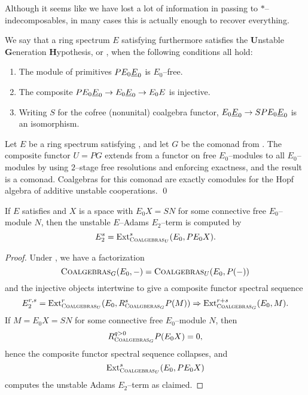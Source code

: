 Although it seems like we have lost a lot of information in passing to \(\ast\)--indecomposables, in many cases this is actually enough to recover everything.  

\begin{definition}
We say that a ring spectrum \(E\) satisfying {\UFH} furthermore satisfies the \textbf{U}nstable \textbf{G}eneration \textbf{H}ypothesis, or , when the following conditions all hold:
\begin{enumerate}
    \item The module of primitives \(P E_0 \underline{\smash{E}}_{0}\) is \(E_0\)--free.
    \item The composite \(P E_0 \underline{\smash{E}}_{0} \to E_0 \underline{\smash{E}}_{0} \to E_0 E\) is injective.
    \item Writing \(S\) for the cofree (nonunital) coalgebra functor, \(E_0 \underline{\smash{E}}_{0} \to SP E_0 \underline{\smash{E}}_{0}\) is an isomorphism.
\end{enumerate}
\end{definition}

\begin{lemma}\label{ShorterUnstableResns}
Let \(E\) be a ring spectrum satisfying {\UGH}, and let \(G\) be the comonad from .  The composite functor \(U = P G\) extends from a functor on free \(E_0\)--modules to all \(E_0\)--modules by using \(2\)--stage free resolutions and enforcing exactness, and the result is a comonad.  Coalgebras for this comonad are exactly comodules for the Hopf algebra of additive unstable cooperations. \qed
\end{lemma}

\begin{corollary}
If \(E\) satisfies {\UGH} and \(X\) is a space with \(E_0 X = SN\) for some connective free \(E_0\)--module \(N\), then the unstable \(E\)--Adams \(E_2\)--term is computed by \[E_2^s = \operatorname{Ext}^s_{\normalfont\textsc{Coalgebras}_U}(E_0, P E_0 X).\]
\end{corollary}
\begin{proof}
Under {\UGH}, we have a factorization \[\normalfont\textsc{Coalgebras}_{G}(E_0, -) = \normalfont\textsc{Coalgebras}_{U}(E_0, P(-))\] and the injective objects intertwine to give a composite functor spectral sequence \[E_2^{r, s} = \operatorname{Ext}^r_{\normalfont\textsc{Coalgebras}_U}(E_0, R^s_{\normalfont\textsc{Coalgberas}_G} P(M)) \Rightarrow \operatorname{Ext}^{r+s}_{\normalfont\textsc{Coalgebras}_G}(E_0, M).\]  If \(M = E_0 X = SN\) for some connective free \(E_0\)--module \(N\), then \[R^{q > 0}_{\normalfont\textsc{Coalgebras}_G} P(E_0 X) = 0,\] hence the composite functor spectral sequence collapses, and \[\operatorname{Ext}^s_{\normalfont\textsc{Coalgebras}_U}(E_0, P E_0 X)\] computes the unstable Adams \(E_2\)--term as claimed.
\end{proof}

